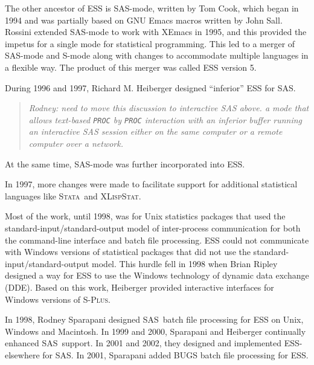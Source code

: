 \documentclass{article}
\newcommand*{\SAS}{\textsc{SAS}}
\newcommand*{\Splus}{\textsc{S-Plus}}
\newcommand*{\XLispStat}{\textsc{XLispStat}}
\newcommand*{\Stata}{\textsc{Stata}}
\newcommand{\stexttt}[1]{{\small\texttt{#1}}}
\newenvironment{Comment}{\begin{quote}\small\itshape }{\end{quote}}
\begin{document}
The other ancestor of ESS is SAS-mode, written by Tom Cook, which began in 1994 
and was partially based on GNU Emacs macros written by John Sall.
Rossini extended SAS-mode to work with XEmacs in 1995, and this provided the
impetus for a single mode for statistical programming.
This led to a merger of SAS-mode and S-mode along with changes
to accommodate multiple languages in a flexible way.  The product of this
merger was called ESS version 5.

During 1996 and 1997, Richard M. Heiberger designed ``inferior'' ESS for \SAS.
\begin{Comment}
Rodney: need to move this discussion to interactive SAS above.
a mode that allows text-based \stexttt{PROC} by
\stexttt{PROC} interaction with an inferior buffer running an interactive SAS
session either on the same computer or a remote computer over a network.
\end{Comment}
At the same time, SAS-mode was further incorporated into ESS.

In 1997, more changes were made to facilitate
support for additional statistical languages like \Stata\ and \XLispStat.

Most of the work, until 1998, was for Unix statistics
packages that used the standard-input/standard-output model of inter-process
communication for both the command-line interface and batch file
processing.  ESS could not communicate
with Windows versions of statistical packages that did not
use the standard-input/standard-output model.  This hurdle
fell in 1998 when Brian Ripley designed a way for ESS to use
the Windows technology of dynamic data exchange (DDE).
Based on this work, Heiberger provided interactive interfaces
for Windows versions of \Splus.

In 1998, Rodney Sparapani designed \SAS\ batch file processing for ESS
on Unix, Windows and Macintosh.  In 1999 and 2000, Sparapani and Heiberger
continually enhanced \SAS\ support. 
In 2001 and 2002, they designed and implemented ESS-elsewhere for \SAS.  
In 2001, Sparapani added BUGS batch file processing for ESS.  
\end{document}

